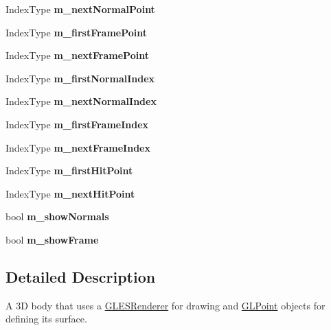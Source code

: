 \begin{DoxyCompactItemize}
Index\+Type {\bfseries m\+\_\+next\+Normal\+Point}
\item 
\mbox{\label{class_g_l_body_a1b14db868b9e81a32a935f6bdaeba118}} 
Index\+Type {\bfseries m\+\_\+first\+Frame\+Point}
\item 
\mbox{\label{class_g_l_body_a1af4cb49c0510aa2afe09670689f3911}} 
Index\+Type {\bfseries m\+\_\+next\+Frame\+Point}
\item 
\mbox{\label{class_g_l_body_a3deb492827b145e78753bb69da5a1273}} 
Index\+Type {\bfseries m\+\_\+first\+Normal\+Index}
\item 
\mbox{\label{class_g_l_body_af69d3ddae94f6a09446970f97ded2cc5}} 
Index\+Type {\bfseries m\+\_\+next\+Normal\+Index}
\item 
\mbox{\label{class_g_l_body_a6db51835ac52260561d8f93ce1e55c15}} 
Index\+Type {\bfseries m\+\_\+first\+Frame\+Index}
\item 
\mbox{\label{class_g_l_body_aef3425aa1efb75b2c758b83372d427d1}} 
Index\+Type {\bfseries m\+\_\+next\+Frame\+Index}
\item 
\mbox{\label{class_g_l_body_abd2520f3e746310a122729a26ce32b9f}} 
Index\+Type {\bfseries m\+\_\+first\+Hit\+Point}
\item 
\mbox{\label{class_g_l_body_af5eb940d625aee425a9fcff361e75d2b}} 
Index\+Type {\bfseries m\+\_\+next\+Hit\+Point}
\item 
\mbox{\label{class_g_l_body_a4707235e9ca92fd90399fb785759d946}} 
bool {\bfseries m\+\_\+show\+Normals}
\item 
\mbox{\label{class_g_l_body_af6486869505b4269277a13734acc9bcd}} 
bool {\bfseries m\+\_\+show\+Frame}
\end{DoxyCompactItemize}


\subsection{Detailed Description}
A 3D body that uses a \mbox{\hyperlink{class_g_l_e_s_renderer}{G\+L\+E\+S\+Renderer}} for drawing and \mbox{\hyperlink{class_g_l_point}{G\+L\+Point}} objects for defining its surface. 

